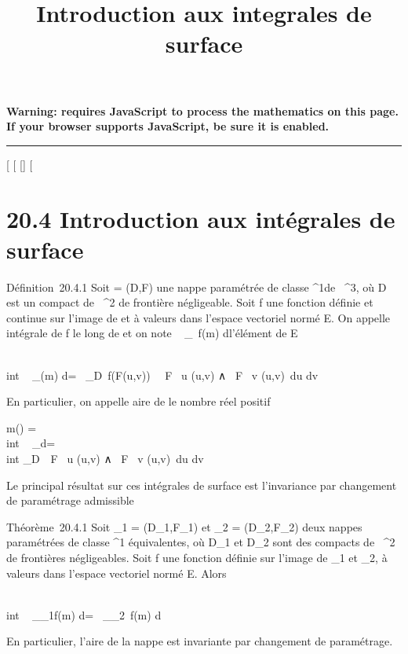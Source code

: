 \documentclass[]{article}
\title{Introduction aux integrales de surface}
\author{}
\date{}
\begin{document}
\maketitle

\textbf{Warning: 
requires JavaScript to process the mathematics on this page.\\ If your
browser supports JavaScript, be sure it is enabled.}

\begin{center}\rule{3in}{0.4pt}\end{center}

[
[
[]
[

\section{20.4 Introduction aux intégrales de surface}

Définition~20.4.1 Soit \Sigma = (D,F) une nappe paramétrée de classe
^1de ~^3, où D est un compact de ~^2
de frontière négligeable. Soit f une fonction définie et continue sur
l'image de \Sigma et à valeurs dans l'espace vectoriel normé E. On appelle
intégrale de f le long de \Sigma et on note \int ~
\int  _\Sigma~f(m) d\sigma l'élément de E

\int  \\int ~
_\Sigmaf(m) d\sigma =\int ~
\int  _D~f(F(u,v))
\ \partial~F \over \partial~u (u,v) ∧ \partial~F
\over \partial~v (u,v)\ du dv

En particulier, on appelle aire de \Sigma le nombre réel positif

m(\Sigma) =\int  \\int ~
_\Sigma d\sigma =\int ~ \\int
 _D\ \partial~F \over \partial~u
(u,v) ∧ \partial~F \over \partial~v (u,v)\
du dv

Le principal résultat sur ces intégrales de surface est l'invariance par
changement de paramétrage admissible

Théorème~20.4.1 Soit \Sigma_1 = (D_1,F_1) et
\Sigma_2 = (D_2,F_2) deux nappes paramétrées de
classe ^1 équivalentes, où D_1 et D_2 sont
des compacts de ~^2 de frontières négligeables. Soit f une
fonction définie sur l'image de \Sigma_1 et \Sigma_2, à valeurs
dans l'espace vectoriel normé E. Alors

\int  \\int ~
_\Sigma_1f(m) d\sigma =\int ~
\int  _\Sigma_2~f(m) d\sigma

En particulier, l'aire de la nappe est invariante par changement de
paramétrage.
\end{document}
